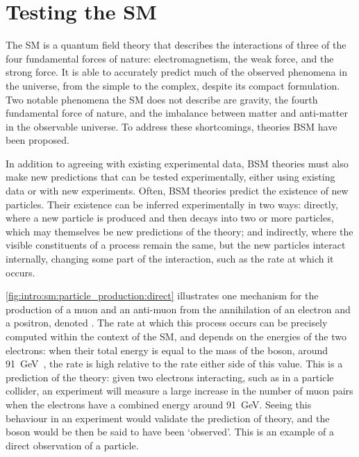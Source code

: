 \chapter{Testing the \acl{SM}}
\label{chap:intro:sm}

The \acl{SM} is a quantum field theory that describes the interactions of three 
of the four fundamental forces of nature: electromagnetism, the weak force, and 
the strong force.
It is able to accurately predict much of the observed phenomena in the 
universe, from the simple to the complex, despite its compact formulation.
Two notable phenomena the \ac{SM} does not describe are gravity, the fourth 
fundamental force of nature, and the imbalance between matter and anti-matter 
in the observable universe.
To address these shortcomings, theories \acl{BSM} have been proposed.

In addition to agreeing with existing experimental data, \ac{BSM} theories must 
also make new predictions that can be tested experimentally, either using 
existing data or with new experiments.
Often, \ac{BSM} theories predict the existence of new particles.
Their existence can be inferred experimentally in two ways: directly, where a 
new particle is produced and then decays into two or more particles, which may 
themselves be new predictions of the theory; and indirectly, where the visible 
constituents of a process remain the same, but the new particles interact 
internally, changing some part of the interaction, such as the rate at which it 
occurs.

\cref{fig:intro:sm:particle_production:direct} illustrates one mechanism for 
the production of a muon and an anti-muon from the annihilation of an electron 
and a positron, denoted \decay{\Pelectron\APelectron}{\Pmuon\APmuon}.
The rate at which this process occurs can be precisely computed within the 
context of the \ac{SM}, and depends on the energies of the two electrons: when 
their total energy is equal to the mass of the \PZ boson, around 
\SI{91}{\GeV}~\cite{PDG2014}, the rate is high relative to the rate either side 
of this value.
This is a prediction of the theory: given two electrons interacting, such as in 
a particle collider, an experiment will measure a large increase in the number 
of muon pairs when the electrons have a combined energy around \SI{91}{\GeV}.
Seeing this behaviour in an experiment would validate the prediction of theory, 
and the \PZ boson would be then be said to have been `observed'.
This is an example of a direct observation of a particle.

